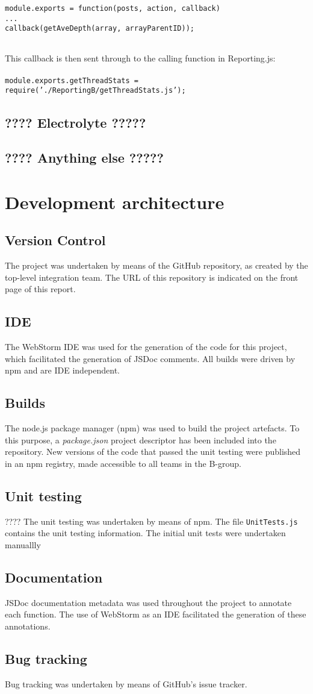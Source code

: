\documentclass[a4paper]{article}
\begin{document}
\texttt{module.exports = function(posts, action, callback) { 
\\ ...
 \\ callback(getAveDepth(array, arrayParentID));
\\ } 
}

This callback is then sent through to the calling function in Reporting.js:
\\
\\ 
\texttt{module.exports.getThreadStats = require('./ReportingB/getThreadStats.js');}

\subsection {???? Electrolyte ?????}

\subsection {???? Anything else ?????}


\section{Development architecture}

\subsection {Version Control} The project was undertaken by means of the GitHub repository, as created by the top-level integration team. The URL of this repository is indicated on the front page of this report.
\subsection {IDE} The WebStorm IDE was used for the generation of the code for this project, which facilitated the generation of JSDoc comments. All builds were driven by npm and are IDE independent. 
\subsection {Builds} The node.js package manager (npm) was used to build the project artefacts. To this purpose, a \textit{package.json} project descriptor has been included into the repository. New versions of the code that passed the unit testing were published in an npm registry, made accessible to all teams in the B-group. 
\subsection {Unit testing} ???? The unit testing was undertaken by means of npm. The file \texttt{UnitTests.js} contains the unit testing information. The initial unit tests were undertaken manuallly 
\subsection {Documentation} JSDoc documentation metadata was used throughout the project to annotate each function. The use of WebStorm as an IDE facilitated the generation of these annotations. 
\subsection {Bug tracking} Bug tracking was undertaken by means of GitHub's issue tracker. 
\end{document}
